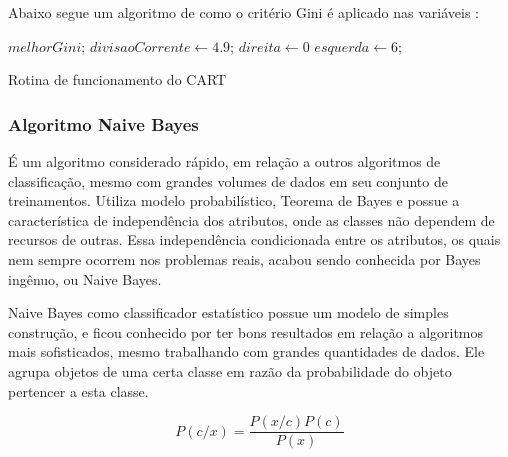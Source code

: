 Abaixo segue um algoritmo de como o critério Gini é aplicado nas variáveis \cite{Raimundo2008}:

\IncMargin{1em}
\begin{algorithm}[h]

\nl $melhorGini$; 
\nl $divisaoCorrente \leftarrow 4.9$; 
\nl $direita \leftarrow 0$\; 
\nl $esquerda \leftarrow 6$; 
\nl {}
 \caption{Rotina de funcionamento do CART}\label{alg:gini}
 
\end{algorithm}
\DecMargin{1em}


\subsubsection{Algoritmo Naive Bayes}\label{cap:refTeor:sssec:nbayes}
É um algoritmo considerado rápido, em relação a outros algoritmos de classificação, mesmo com grandes volumes de dados em seu conjunto de treinamentos. Utiliza modelo probabilístico, Teorema de Bayes e possue a característica de independência dos atributos, onde as classes não dependem de recursos de outras. Essa independência condicionada  entre os atributos, os quais nem sempre ocorrem nos problemas reais, acabou sendo conhecida por Bayes ingênuo, ou Naive Bayes.

Naive Bayes como classificador estatístico possue um modelo de simples construção, e ficou conhecido por ter bons resultados em relação a algoritmos mais sofisticados, mesmo trabalhando com grandes quantidades de dados. Ele agrupa objetos de uma certa classe em razão da probabilidade do objeto pertencer a esta classe. 

\begin{equation}
 P(c/x)= \frac{P(x/c)P(c)}{P(x)}
\end{equation}

